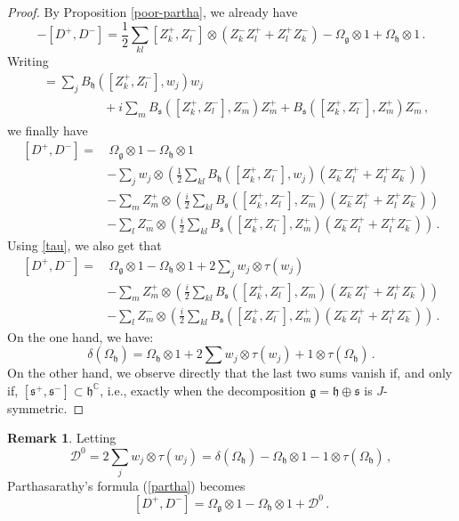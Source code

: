\documentclass{amsart}[draft,11pt]
\newcommand{\mg}{\mathfrak{g}}
\newcommand{\mh}{\mathfrak{h}}
\newcommand{\ms}{\mathfrak{s}}
\numberwithin{equation}{section}
\theoremstyle{definition}
\newtheorem{rem}[theorem]{Remark}
\begin{document}
\begin{proof}
By Proposition \ref{poor-partha}, we already have
$$
-[D^+,D^-]= \frac12\sum_{kl}  [Z_k^+,Z_l^-] \otimes (Z_k^-Z_l^+ + Z_l^+Z_k^-)
-    \Omega_{\mg}\otimes 1 +    \Omega_{\mh}\otimes 1\,.
$$
Writing
\begin{align*}
[Z_k^+,Z_l^-]&=
\sum_j B_\mh([Z_k^+,Z_l^-],w_j)w_j \\
&\phantom{\sum_j B_\mh([Z_k^+}+i\sum_m B_\ms([Z_k^+,Z_l^-],Z_m^-)Z_m^+ +
B_\ms([Z_k^+,Z_l^-],Z_m^+)Z_m^- \,,
\end{align*}
we finally have
\begin{equation} 
\label{partha-sum}
\begin{split}
[D^+,D^-]= &\,\Omega_{\mg}
\otimes 1 - \Omega_\mh \otimes 1 \\ &
-\sum_j w_j \otimes 
\left( \frac12\sum_{kl}B_\mh([Z_k^+,Z_l^-],w_j)
(Z_k^-Z_l^++Z_l^+Z_k^-)\right) \\ &
-\sum_{m}
Z_m^+\otimes \left(\frac{i}2 \sum_{kl} 
B_\ms([Z_k^+,Z_l^-],Z_m^-)
(Z_k^-Z_l^+ + Z_l^+Z_k^-) \right) \\ &
-\sum_l 
Z_m^-\otimes \left( \frac{i}2\sum_{kl}
B_\ms([Z_k^+,Z_l^-],Z_m^+)
(Z_k^-Z_l^+ + Z_l^+Z_k^-) \right)\,.
\end{split}
\end{equation}
Using \eqref{tau}, we also get that
\begin{equation} 
\label{partha-sum2}
\begin{split}
[D^+,D^-]= & \, \Omega_{\mg}\otimes 1 - \Omega_{\mh}\otimes 1 
+2\sum_j w_j \otimes \tau(w_j) \\ &
-\sum_{m}
Z_m^+\otimes \left(\frac{i}2 \sum_{kl} 
B_\ms([Z_k^+,Z_l^-],Z_m^-)
(Z_k^-Z_l^+ + Z_l^+Z_k^-) \right) \\ &
-\sum_l 
Z_m^-\otimes \left( \frac{i}2\sum_{kl}
B_\ms([Z_k^+,Z_l^-],Z_m^+)
(Z_k^-Z_l^+ + Z_l^+Z_k^-) \right)\,.
\end{split}
\end{equation}
On the one hand, we have:
$$
\delta(\Omega_{\mh}) = 
\Omega_{\mh} \otimes 1 + 2\sum w_j \otimes \tau(w_j) + 1\otimes \tau(\Omega_{\mh})\,.
$$ 
On the other hand, we observe directly that the last two sums vanish if, and only if,
 $[\ms^+,\ms^-]\subset \mh^\mathbb{C}$, i.e., exactly when the decomposition $\mg= \mh \oplus \ms$ is $J$-symmetric.
\end{proof}

\begin{rem}
\label{defd0}
Letting
$$ \mathcal{D}^0 
= 2 \sum_j w_j \otimes \tau(w_j)
=\delta(\Omega_\mathfrak{h})-\Omega_\mathfrak{h}\otimes 1-1\otimes \tau(\Omega_\mathfrak{h})
\, ,$$
Parthasarathy's formula (\ref{partha}) becomes
$$ [D^+,D^-]=\Omega_\mathfrak{g}\otimes 1-\Omega_\mathfrak{h}\otimes 1+\mathcal{D}^0\,.$$
\end{rem}
\end{document}
